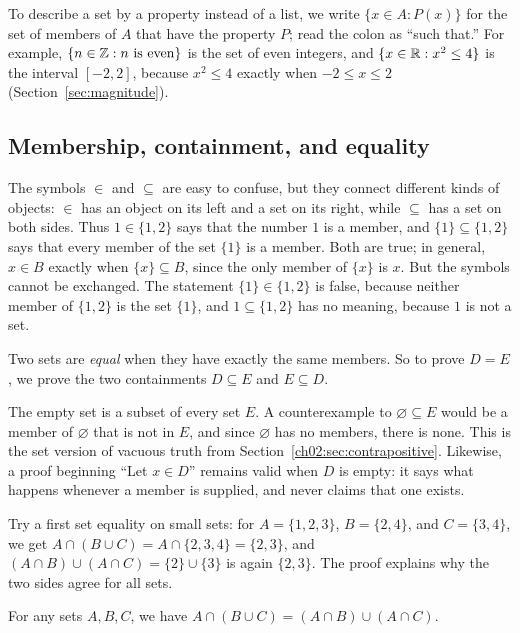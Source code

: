 To describe a set by a property instead of a list, we write $\{x\in A:P(x)\}$ for the set of members of $A$ that have the property $P$; read the colon as ``such that.'' For example, $\{n\in\mathbb Z:n\text{ is even}\}$ is the set of even integers, and $\{x\in\mathbb R:x^2\le4\}$ is the interval $[-2,2]$, because $x^2\le4$ exactly when $-2\le x\le2$ (Section~\ref{sec:magnitude}).

\subsection*{Membership, containment, and equality}
The symbols $\in$ and $\subseteq$ are easy to confuse, but they connect different kinds of objects: $\in$ has an object on its left and a set on its right, while $\subseteq$ has a set on both sides. Thus $1\in\{1,2\}$ says that the number $1$ is a member, and $\{1\}\subseteq\{1,2\}$ says that every member of the set $\{1\}$ is a member. Both are true; in general, $x\in B$ exactly when $\{x\}\subseteq B$, since the only member of $\{x\}$ is $x$. But the symbols cannot be exchanged. The statement $\{1\}\in\{1,2\}$ is false, because neither member of $\{1,2\}$ is the set $\{1\}$, and $1\subseteq\{1,2\}$ has no meaning, because $1$ is not a set.

Two sets are \emph{equal} when they have exactly the same members. So to prove $D=E$, we prove the two containments $D\subseteq E$ and $E\subseteq D$.

The empty set is a subset of every set $E$. A counterexample to $\varnothing\subseteq E$ would be a member of $\varnothing$ that is not in $E$, and since $\varnothing$ has no members, there is none. This is the set version of vacuous truth from Section~\ref{ch02:sec:contrapositive}. Likewise, a proof beginning ``Let $x\in D$'' remains valid when $D$ is empty: it says what happens whenever a member is supplied, and never claims that one exists.

Try a first set equality on small sets: for $A=\{1,2,3\}$, $B=\{2,4\}$, and $C=\{3,4\}$, we get $A\cap(B\cup C)=A\cap\{2,3,4\}=\{2,3\}$, and $(A\cap B)\cup(A\cap C)=\{2\}\cup\{3\}$ is again $\{2,3\}$. The proof explains why the two sides agree for all sets.

\par\noindent\begin{minipage}{\linewidth}
\begin{proposition}\label{ch03:prop:distributive}
For any sets $A,B,C$, we have $A\cap(B\cup C)=(A\cap B)\cup(A\cap C)$.
\end{proposition}
\end{minipage}\par


